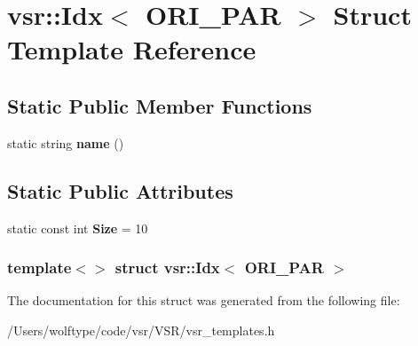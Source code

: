 \hypertarget{structvsr_1_1_idx_3_01_o_r_i___p_a_r_01_4}{\section{vsr\-:\-:Idx$<$ O\-R\-I\-\_\-\-P\-A\-R $>$ Struct Template Reference}
\label{structvsr_1_1_idx_3_01_o_r_i___p_a_r_01_4}
}
\subsection*{Static Public Member Functions}
\begin{DoxyCompactItemize}
\item 
\hypertarget{structvsr_1_1_idx_3_01_o_r_i___p_a_r_01_4_a976fc7c10058955d9cfaa3199b08e100}{static string {\bfseries name} ()}\label{structvsr_1_1_idx_3_01_o_r_i___p_a_r_01_4_a976fc7c10058955d9cfaa3199b08e100}

\end{DoxyCompactItemize}
\subsection*{Static Public Attributes}
\begin{DoxyCompactItemize}
\item 
\hypertarget{structvsr_1_1_idx_3_01_o_r_i___p_a_r_01_4_a53bff51a4738b7e1adae439f05137dc3}{static const int {\bfseries Size} = 10}\label{structvsr_1_1_idx_3_01_o_r_i___p_a_r_01_4_a53bff51a4738b7e1adae439f05137dc3}

\end{DoxyCompactItemize}
\subsubsection*{template$<$$>$ struct vsr\-::\-Idx$<$ O\-R\-I\-\_\-\-P\-A\-R $>$}



The documentation for this struct was generated from the following file\-:\begin{DoxyCompactItemize}
\item 
/\-Users/wolftype/code/vsr/\-V\-S\-R/vsr\-\_\-templates.\-h\end{DoxyCompactItemize}
